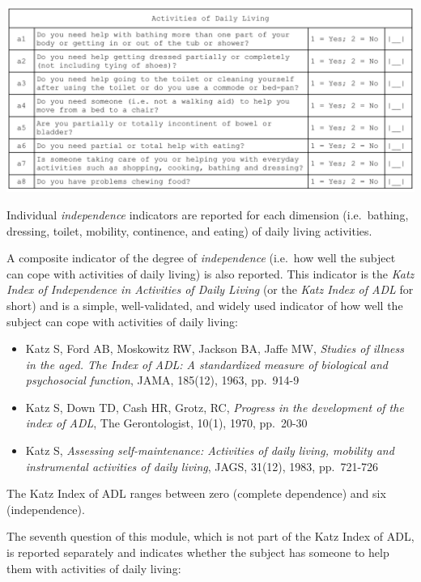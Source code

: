 \documentclass[12pt,a4paper]{book}
\theoremstyle{definition}
\theoremstyle{definition}
\theoremstyle{definition}
\theoremstyle{remark}
\begin{document}
\begin{center}\includegraphics[width=23.89in]{figures/questionnaire05} \end{center}

Individual \emph{independence} indicators are reported for each
dimension (i.e.~bathing, dressing, toilet, mobility, continence, and
eating) of daily living activities.

A composite indicator of the degree of \emph{independence} (i.e.~how
well the subject can cope with activities of daily living) is also
reported. This indicator is the \emph{Katz Index of Independence in
Activities of Daily Living} (or the \emph{Katz Index of ADL} for short)
and is a simple, well-validated, and widely used indicator of how well
the subject can cope with activities of daily living:

\begin{itemize}
\item
  Katz S, Ford AB, Moskowitz RW, Jackson BA, Jaffe MW, \emph{Studies of
  illness in the aged. The Index of ADL: A standardized measure of
  biological and psychosocial function}, JAMA, 185(12), 1963, pp.~914-9
\item
  Katz S, Down TD, Cash HR, Grotz, RC, \emph{Progress in the development
  of the index of ADL}, The Gerontologist, 10(1), 1970, pp.~20-30
\item
  Katz S, \emph{Assessing self-maintenance: Activities of daily living,
  mobility and instrumental activities of daily living}, JAGS, 31(12),
  1983, pp.~721-726
\end{itemize}

The Katz Index of ADL ranges between zero (complete dependence) and six
(independence).

\newpage

The seventh question of this module, which is not part of the Katz Index
of ADL, is reported separately and indicates whether the subject has
someone to help them with activities of daily living:
\end{document}
